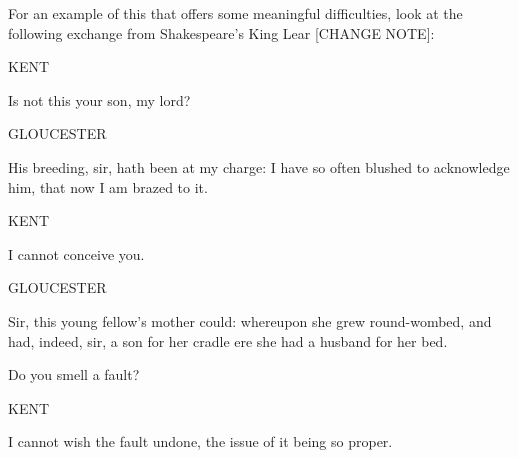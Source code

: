 \documentclass[]{article}
\begin{document}
For an example of this that offers some meaningful difficulties, look at the following exchange from Shakespeare's King Lear [CHANGE NOTE]:



KENT

Is not this your son, my lord?

GLOUCESTER

His breeding, sir, hath been at my charge: I have
so often blushed to acknowledge him, that now I am
brazed to it.

KENT

I cannot conceive you.

GLOUCESTER

Sir, this young fellow's mother could: whereupon
she grew round-wombed, and had, indeed, sir, a son
for her cradle ere she had a husband for her bed. 

Do you smell a fault?  

KENT

I cannot wish the fault undone, the issue of it
being so proper.
\end{document}

